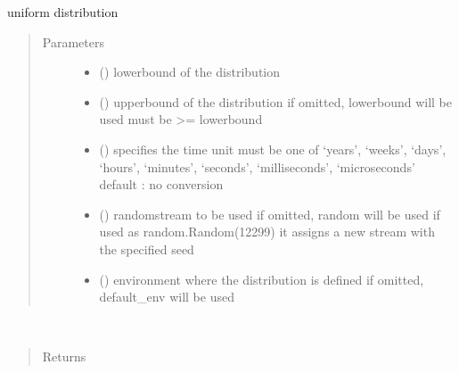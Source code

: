 \documentclass[letterpaper,10pt,english]{sphinxmanual}
\begin{document}
\begin{fulllineitems}
\label{\detokenize{Reference:salabim.Uniform}}
uniform distribution
\begin{quote}\begin{description}
\item[{Parameters}] \leavevmode\begin{itemize}
\item {} 
 () \textendash{} lowerbound of the distribution

\item {} 
 () \textendash{} upperbound of the distribution 
if omitted, lowerbound will be used 
must be \textgreater{}= lowerbound

\item {} 
 () \textendash{} specifies the time unit 
must be one of ‘years’, ‘weeks’, ‘days’, ‘hours’, ‘minutes’, ‘seconds’, ‘milliseconds’, ‘microseconds’ 
default : no conversion 

\item {} 
 () \textendash{} randomstream to be used 
if omitted, random will be used 
if used as random.Random(12299)
it assigns a new stream with the specified seed

\item {} 
 ({\hyperref[\detokenize{Reference:salabim.Environment}]{}}) \textendash{} environment where the distribution is defined 
if omitted, default\_env will be used

\end{itemize}

\end{description}\end{quote}

\begin{fulllineitems}
\label{\detokenize{Reference:salabim.Uniform.mean}}~\begin{quote}\begin{description}
\item[{Returns}] \leavevmode
{}


\end{description}
\end{quote}
\end{fulllineitems}
\end{fulllineitems}
\end{document}
